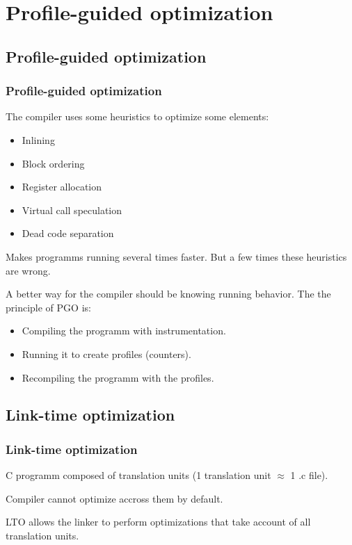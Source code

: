 \documentclass{beamer}
\begin{document}
\section{Profile-guided optimization}

    \begin{frame}
        \tableofcontents[currentsection]
    \end{frame}

    \subsection{Profile-guided optimization}

    \begin{frame}
        \frametitle{Profile-guided optimization}

        The compiler uses some heuristics to optimize some elements:
        \begin{itemize}
            \item Inlining
            \item Block ordering
            \item Register allocation
            \item Virtual call speculation
            \item Dead code separation
        \end{itemize}
        Makes programms running several times faster.
        But a few times these heuristics are wrong.
    \end{frame}


    \begin{frame}
        A better way for the compiler should be knowing running behavior.
        The the principle of PGO is:
        \begin{itemize}
            \item Compiling the programm with instrumentation.
            \item Running it to create profiles (counters).
            \item Recompiling the programm with the profiles.
        \end{itemize}
    \end{frame}
    \subsection{Link-time optimization}

    \begin{frame}
        \frametitle{Link-time optimization}

        C programm composed of translation units (1 translation unit $ \approx $ 1 .c file).

        Compiler cannot optimize accross them by default.

        LTO allows the linker to perform optimizations that take account of all translation units.
    \end{frame}
\end{document}
